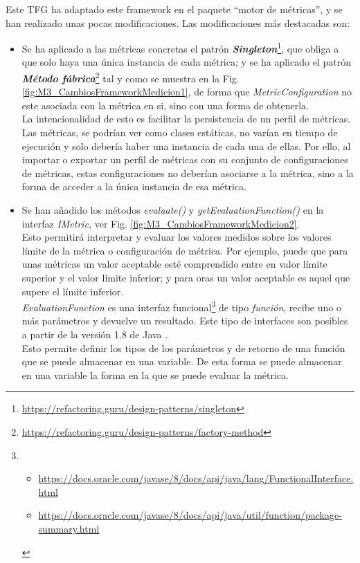 Este TFG ha adaptado este framework en el paquete ``motor de métricas'', y se han realizado unas pocas modificaciones. Las modificaciones más destacadas son:

\begin{itemize}
	\tightlist
	\item Se ha aplicado a las métricas concretas el patrón \textit{\textbf{Singleton}}\footnote{\url{https://refactoring.guru/design-patterns/singleton}}, que obliga a que solo haya una única instancia de cada métrica; y se ha aplicado el patrón \textit{\textbf{Método fábrica}}\footnote{\url{https://refactoring.guru/design-patterns/factory-method}} tal y como se muestra en la Fig. \ref{fig:M3_CambiosFrameworkMedicion1}, de forma que \textit{MetricConfiguration} no este asociada con la métrica en si, sino con una forma de obtenerla.\\
	La intencionalidad de esto es facilitar la persistencia de un perfil de métricas. Las métricas, se podrían ver como clases estáticas, no varían en tiempo de ejecución y solo debería haber una instancia de cada una de ellas. Por ello, al importar o exportar un perfil de métricas con su conjunto de configuraciones de métricas, estas configuraciones no deberían asociarse a la métrica, sino a la forma de acceder a la única instancia de esa métrica. 
	\item Se han añadido los métodos \textit{evaluate()} y \textit{getEvaluationFunction()} en la interfaz \textit{IMetric}, ver Fig. \ref{fig:M3_CambiosFrameworkMedicion2}.\\
	Esto permitirá interpretar y evaluar los valores medidos sobre los valores límite de la métrica o configuración de métrica. Por ejemplo, puede que para unas métricas un valor aceptable esté comprendido entre en valor límite superior y el valor límite inferior; y para oras un valor aceptable es aquel que supere el límite inferior.\\
	\textit{EvaluationFunction} es una interfaz funcional\footnote{
		\begin{itemize}
			\tightlist
			\item \url{https://docs.oracle.com/javase/8/docs/api/java/lang/FunctionalInterface.html}
			\item \url{https://docs.oracle.com/javase/8/docs/api/java/util/function/package-summary.html}
		\end{itemize}} 
	de tipo \textit{función}, recibe uno o más parámetros y devuelve un resultado. Este tipo de interfaces son posibles a partir de la versión 1.8 de Java \cite{noauthor_functionalinterface_nodate}.\\
	Esto permite definir los tipos de los parámetros y de retorno de una función que se puede almacenar en una variable. De esta forma se puede almacenar en una variable la forma en la que se puede evaluar la métrica.
\end{itemize}


